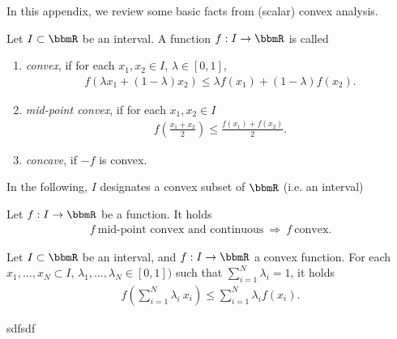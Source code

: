 In this appendix, we review some basic facts from (scalar) convex analysis. 


\begin{definition}
 Let $I \subset \bbmR$ be an interval. A function $f: I \rightarrow \bbmR$ is called 
 \begin{enumerate}
  \item \emph{convex}, if for each $x_1, x_2 \in I$, $\lambda \in [0,1]$, 
  \begin{align}
   f(\lambda x_1 + (1 - \lambda) x_2 ) \leq \lambda f(x_1) + (1-\lambda) f(x_2).
  \end{align}
  \item \emph{mid-point convex}, if for each $x_1, x_2 \in I$
  \begin{align}
   f\left(\frac{x_1 + x_2}{2}\right) \leq \frac{f(x_1)+ f(x_2)}{2}.
  \end{align}
  \item \emph{concave}, if $-f$ is convex.
 \end{enumerate}
\end{definition}

In the following, $I$ designates a convex subset of $\bbmR$ (i.e. an interval)


\begin{proposition}
 Let $f: I \rightarrow \bbmR$ be a function. It holds
 \begin{align}
  f \ \text{mid-point convex and continuous} \ \Rightarrow \ f \ \text{convex}.
 \end{align}
\end{proposition}





\begin{theorem}
 Let $I \subset \bbmR$ be an interval, and $f: I \rightarrow \bbmR$ a convex function. For each $x_1, \dots, x_N \subset I$, $\lambda_1,\dots, \lambda_N \in [0,1])$ such that $\sum_{i=1}^N \lambda_i = 1$, it holds
 \begin{align}
  f\left(\sum_{i=1}^N \lambda_i\ x_i\right) \leq \sum_{i=1}^N \lambda_i f(x_i).
 \end{align}
\end{theorem}

\begin{theorem}
 sdfsdf
\end{theorem}

